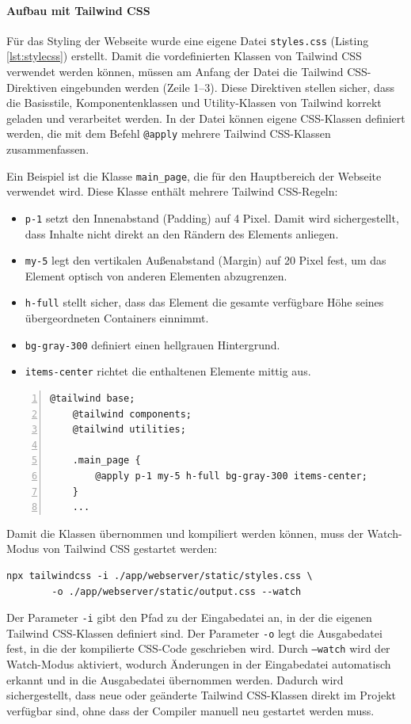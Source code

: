 \documentclass[12pt, letterpaper]{article}
\begin{document}
  \paragraph{Aufbau mit Tailwind CSS}
  \par \textbf{}
  \par Für das Styling der Webseite wurde eine eigene Datei \texttt{styles.css} (Listing \ref{lst:stylecss}) erstellt. Damit die vordefinierten Klassen von Tailwind CSS verwendet werden können, müssen am Anfang der Datei die Tailwind CSS-Direktiven eingebunden werden (Zeile 1–3). Diese Direktiven stellen sicher, dass die Basisstile, Komponentenklassen und Utility-Klassen von Tailwind korrekt geladen und verarbeitet werden. In der Datei können eigene CSS-Klassen definiert werden, die mit dem Befehl \texttt{@apply} mehrere Tailwind CSS-Klassen zusammenfassen.
  \par Ein Beispiel ist die Klasse \texttt{main\_page}, die für den Hauptbereich der Webseite verwendet wird. Diese Klasse enthält mehrere Tailwind CSS-Regeln:
  \begin{itemize}
    \item \texttt{p-1} setzt den Innenabstand (Padding) auf 4 Pixel. Damit wird sichergestellt, dass Inhalte nicht direkt an den Rändern des Elements anliegen.
    \item \texttt{my-5} legt den vertikalen Außenabstand (Margin) auf 20 Pixel fest, um das Element optisch von anderen Elementen abzugrenzen.
    \item \texttt{h-full} stellt sicher, dass das Element die gesamte verfügbare Höhe seines übergeordneten Containers einnimmt.
    \item \texttt{bg-gray-300} definiert einen hellgrauen Hintergrund.
    \item \texttt{items-center} richtet die enthaltenen Elemente mittig aus. 
  \end{itemize}
  \begin{lstlisting}[style=htmlcssjs, numbers=left, label={lst:stylecss}, caption={style.css}]
    @tailwind base;
    @tailwind components;
    @tailwind utilities;

    .main_page {
        @apply p-1 my-5 h-full bg-gray-300 items-center;
    }
    ...
  \end{lstlisting}
  \par Damit die Klassen übernommen und kompiliert werden können, muss der Watch-Modus von Tailwind CSS gestartet werden:
  \begin{Verbatim}[frame=single]
    npx tailwindcss -i ./app/webserver/static/styles.css \
        -o ./app/webserver/static/output.css --watch  
  \end{Verbatim}
  \par Der Parameter \texttt{-i} gibt den Pfad zu der Eingabedatei an, in der die eigenen Tailwind CSS-Klassen definiert sind. Der Parameter \texttt{-o} legt die Ausgabedatei fest, in die der kompilierte CSS-Code geschrieben wird. Durch \texttt{--watch} wird der Watch-Modus aktiviert, wodurch Änderungen in der Eingabedatei automatisch erkannt und in die Ausgabedatei übernommen werden. Dadurch wird sichergestellt, dass neue oder geänderte Tailwind CSS-Klassen direkt im Projekt verfügbar sind, ohne dass der Compiler manuell neu gestartet werden muss.
  
\end{document}
